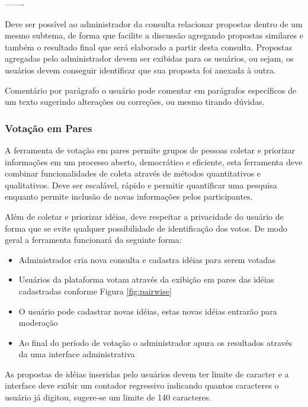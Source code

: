 \documentclass[12pt]{article}
\begin{document}
-------

Deve ser possível ao administrador da consulta relacionar propostas dentro de
um mesmo subtema, de forma que facilite a discussão agregando propostas
similares e também o resultado final que será elaborado a partir desta
consulta. Propostas agregadas pelo administrador devem ser exibidas para os
usuários, ou sejam, os usuários devem conseguir identificar que sua proposta
foi anexada à outra.

Comentário por parágrafo o usuário pode comentar em parágrafos específicos de
um texto sugerindo alterações ou correções, ou mesmo tirando dúvidas.

\subsubsection{Votação em Pares}

A ferramenta de votação em pares permite grupos de pessoas coletar e priorizar
informações em um processo aberto, democrático e eficiente, esta ferramenta
deve combinar funcionalidades de coleta através de métodos quantitativos e
qualitativos. Deve ser escalável, rápido e permitir quantificar uma pesquisa
enquanto permite inclusão de novas informações pelos participantes.

Além de coletar e priorizar idéias, deve respeitar a privacidade do usuário de
forma que se evite qualquer possibilidade de identificação dos votos. De modo
geral a ferramenta funcionará da seguinte forma:

\begin{itemize}
  \item Administrador cria nova consulta e cadastra idéias para serem votadas
  \item Usuários da plataforma votam através da exibição em pares das
    idéias cadastradas conforme Figura \ref{fig:pairwise}
  \item O usuário pode cadastrar novas idéias, estas novas idéias entrarão
    para moderação
  \item Ao final do período de votação o administrador apura os resultados
    através da uma interface administrativa
\end{itemize}

As propostas de idéias inseridas pelo usuários devem ter limite de caracter e
a interface deve exibir um contador regressivo indicando quantos caracteres o
usuário já digitou, sugere-se um limite de 140 caracteres.
\end{document}
